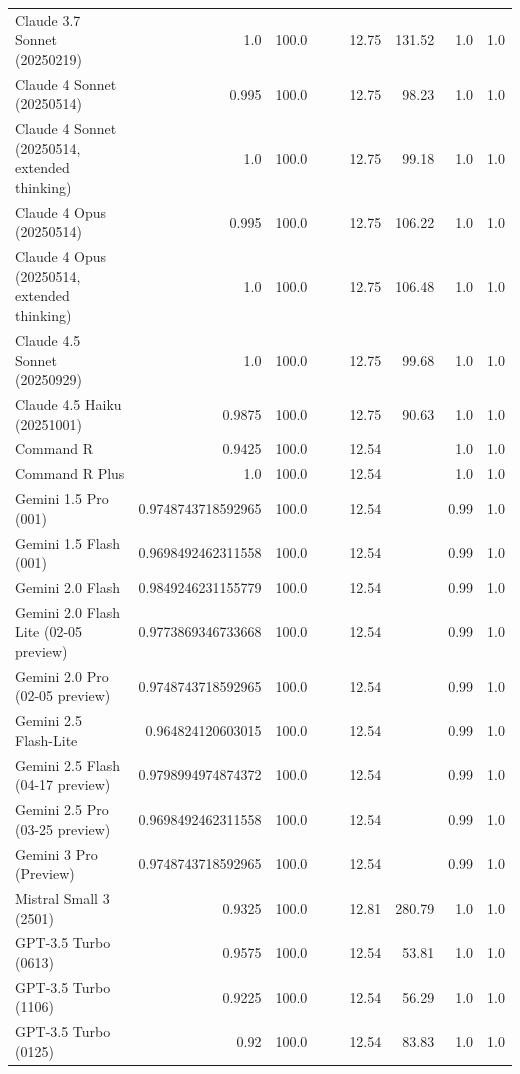 \begin{table}[htp]
{\begin{tabular}{lrrrrrrrr}
Claude 3.7 Sonnet (20250219) & 1.0 & 100.0 &  &  & 12.75 & 131.52 & 1.0 & 1.0 \\
Claude 4 Sonnet (20250514) & 0.995 & 100.0 &  &  & 12.75 & 98.23 & 1.0 & 1.0 \\
Claude 4 Sonnet (20250514, extended thinking) & 1.0 & 100.0 &  &  & 12.75 & 99.18 & 1.0 & 1.0 \\
Claude 4 Opus (20250514) & 0.995 & 100.0 &  &  & 12.75 & 106.22 & 1.0 & 1.0 \\
Claude 4 Opus (20250514, extended thinking) & 1.0 & 100.0 &  &  & 12.75 & 106.48 & 1.0 & 1.0 \\
Claude 4.5 Sonnet (20250929) & 1.0 & 100.0 &  &  & 12.75 & 99.68 & 1.0 & 1.0 \\
Claude 4.5 Haiku (20251001) & 0.9875 & 100.0 &  &  & 12.75 & 90.63 & 1.0 & 1.0 \\
Command R & 0.9425 & 100.0 &  &  & 12.54 &  & 1.0 & 1.0 \\
Command R Plus & 1.0 & 100.0 &  &  & 12.54 &  & 1.0 & 1.0 \\
Gemini 1.5 Pro (001) & 0.9748743718592965 & 100.0 &  &  & 12.54 &  & 0.99 & 1.0 \\
Gemini 1.5 Flash (001) & 0.9698492462311558 & 100.0 &  &  & 12.54 &  & 0.99 & 1.0 \\
Gemini 2.0 Flash & 0.9849246231155779 & 100.0 &  &  & 12.54 &  & 0.99 & 1.0 \\
Gemini 2.0 Flash Lite (02-05 preview) & 0.9773869346733668 & 100.0 &  &  & 12.54 &  & 0.99 & 1.0 \\
Gemini 2.0 Pro (02-05 preview) & 0.9748743718592965 & 100.0 &  &  & 12.54 &  & 0.99 & 1.0 \\
Gemini 2.5 Flash-Lite & 0.964824120603015 & 100.0 &  &  & 12.54 &  & 0.99 & 1.0 \\
Gemini 2.5 Flash (04-17 preview) & 0.9798994974874372 & 100.0 &  &  & 12.54 &  & 0.99 & 1.0 \\
Gemini 2.5 Pro (03-25 preview) & 0.9698492462311558 & 100.0 &  &  & 12.54 &  & 0.99 & 1.0 \\
Gemini 3 Pro (Preview) & 0.9748743718592965 & 100.0 &  &  & 12.54 &  & 0.99 & 1.0 \\
Mistral Small 3 (2501) & 0.9325 & 100.0 &  &  & 12.81 & 280.79 & 1.0 & 1.0 \\
GPT-3.5 Turbo (0613) & 0.9575 & 100.0 &  &  & 12.54 & 53.81 & 1.0 & 1.0 \\
GPT-3.5 Turbo (1106) & 0.9225 & 100.0 &  &  & 12.54 & 56.29 & 1.0 & 1.0 \\
GPT-3.5 Turbo (0125) & 0.92 & 100.0 &  &  & 12.54 & 83.83 & 1.0 & 1.0 \\

\end{tabular}}
\end{table}
